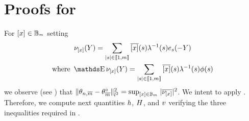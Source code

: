 \section{Proofs for }
 \begin{pro}\label{pro:conc}
   For $[x]\in{\mathbb B}_{^{_{m}}}$ setting
   \begin{multline*}
   \nu_{\He}(\rY)=\sum_{|s|\in\nset{1,\Di}}\ofHe{(s)}\fedfI[(s)]\bas_s(-\rY)\\
   \text{where }\E\nu_{\He}(\rY)=\sum_{|s|\in\nset{1,\Di}}\ofHe{(s)}\fedfI[(s)]\fydf[(s)]
   \end{multline*}
   we observe (see ) that
   $\lVert\theta_{n, \overline{{m}}}-\theta^{\circ}_{\overline{m}}\rVert_{l^{2}}^2=\sup_{[x]\in{\mathbb B}_{^{_{m}}}}|\overline{\nu_{[x]}}|^2$. We
   intent to apply . Therefore, we compute next quantities
   $h$, $H$, and $v$ verifying the three inequalities required
   in .


\end{pro}
